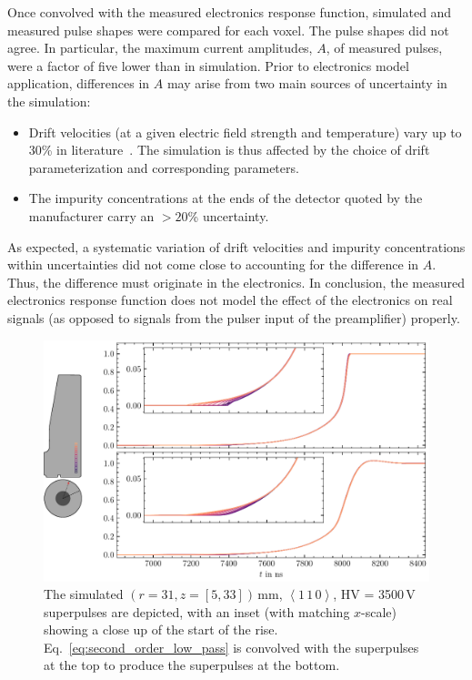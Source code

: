 Once convolved with the measured electronics response function, simulated and measured pulse shapes were compared for each voxel. The pulse shapes did not agree. In particular, the maximum current amplitudes, $A$, of measured pulses, were a factor of five lower than in simulation. Prior to electronics model application, differences in $A$ may arise from two main sources of uncertainty in the simulation:
\begin{itemize}
	\item Drift velocities (at a given electric field strength and temperature) vary up to 30\% in literature~\cite{driftvelGe,drift_pars,drift_parametrization,siggen}. The simulation is thus affected by the choice of drift parameterization and corresponding parameters.
	\item The impurity concentrations at the ends of the detector quoted by the manufacturer carry an $>20$\% uncertainty. 
\end{itemize}
As expected, a systematic variation of drift velocities and impurity concentrations within uncertainties did not come close to accounting for the difference in $A$. Thus, the difference must originate in the electronics. In conclusion, the measured electronics response function does not model the effect of the electronics on real signals (as opposed to signals from the pulser input of the preamplifier) properly. 
\begin{figure}[htb]
    \centering
    \includegraphics[width=6in]{figs/sim/electronics_response_application.pdf}
    \caption{The simulated $(r = 31, z = [5,33])$\,mm, $\left<1\,1\,0\right>$, HV = 3500\,V superpulses are depicted, with an inset (with matching $x$-scale) showing a close up of the start of the rise. Eq.~\ref{eq:second_order_low_pass} is convolved with the superpulses at the top to produce the superpulses at the bottom.}
    \label{fig:electronics_response_application}
\end{figure}

